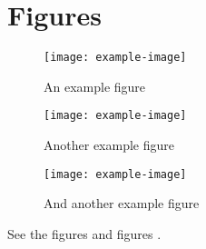 \documentclass{book}
\begin{document}
\chapter{Figures}
\begin{figure}
\texttt{[image: example-image]}
\caption{An example figure}
\label{fig:example}
\end{figure}
\clearpage
\begin{figure}
\texttt{[image: example-image]}
\caption{Another example figure}
\label{fig:other}
\end{figure}
\clearpage
\begin{figure}
\texttt{[image: example-image]}
\caption{And another example figure}
\label{fig:last}
\end{figure}
\clearpage
See the figures \textcolor{red}{}
and figures \textcolor{blue}{}.
\end{document}
